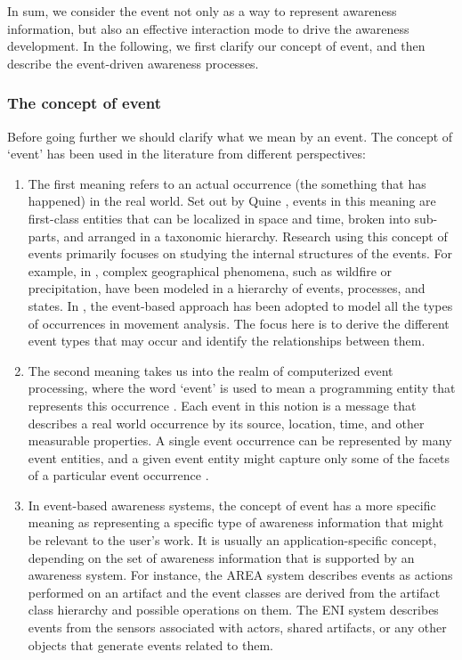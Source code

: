 In sum, we consider the event not only as a way to represent awareness information, but also an effective interaction mode to drive the awareness development. In the following, we first clarify our concept of event, and then describe the event-driven awareness processes. 

\subsubsection{The concept of event} %
\label{ssub:the_concept_of_events}
Before going further we should clarify what we mean by an event. The concept of `event' has been used in the literature from different perspectives:

\begin{enumerate}
   \item The first meaning refers to an actual occurrence (the something that has happened) in the real world. Set out by Quine \cite{quine1985events}, events in this meaning are first-class entities that can be localized in space and time, broken into sub-parts, and arranged in a taxonomic hierarchy. Research using this concept of events primarily focuses on studying the internal structures of the events. For example, in \cite{Yuan2001}, complex geographical phenomena, such as wildfire or precipitation, have been modeled in a hierarchy of events, processes, and states. In \cite{Andrienko2011}, the event-based approach has been adopted to model all the types of occurrences in movement analysis. The focus here is to derive the different event types that may occur and identify the relationships between them.
   \item The second meaning takes us into the realm of computerized event processing, where the word `event' is used to mean a programming entity that represents this occurrence \cite{Spiteri2000}. Each event in this notion is a message that describes a real world occurrence by its source, location, time, and other measurable properties. A single event occurrence can be represented by many event entities, and a given event entity might capture only some of the facets of a particular event occurrence \cite{Etzion2010}.
   \item In event-based awareness systems, the concept of event has a more specific meaning as representing a specific type of awareness information that might be relevant to the user's work. It is usually an application-specific concept, depending on the set of awareness information that is supported by an awareness system. For instance, the AREA system \cite{fuchs1999a} describes events as actions performed on an artifact and the event classes are derived from the artifact class hierarchy and possible operations on them. The ENI system \cite{Gross2004} describes events from the sensors associated with actors, shared artifacts, or any other objects that generate events related to them. 
\end{enumerate}


